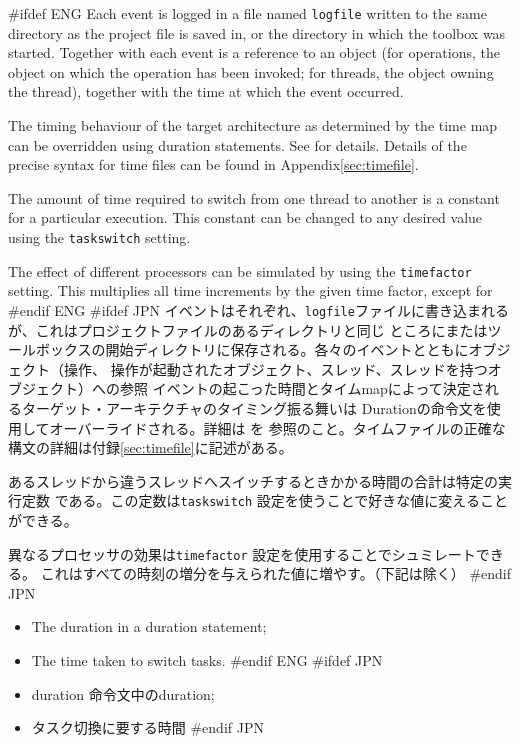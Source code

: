 \documentclass[\pformat,12pt]{article}
\begin{document}
#ifdef ENG
Each event is logged in a file named \texttt{logfile} written to the
same directory as the project file is saved in, or the directory in
which the toolbox was started. Together with each event is a reference
to an object (for operations, the object on which the operation has
been invoked; for threads, the object owning the thread), together
with the time at which the event occurred.

The timing behaviour of the target architecture as determined by the
time map can be overridden using duration statements. See
\cite{LangManPP-CSK} for details. Details of the precise syntax for time
files can be found in Appendix\ref{sec:timefile}.

The amount of time required to switch from one thread to another is a
constant for a particular execution. This constant can be changed to
any desired value using the \texttt{taskswitch} setting.

The effect of different processors can be simulated by using the
\texttt{timefactor} setting. This multiplies all time increments by
the given time factor, except for
#endif ENG
#ifdef JPN
イベントはそれぞれ、\texttt{logfile}ファイルに書き込まれるが、これはプロジェクトファイルのあるディレクトリと同じ
ところにまたはツールボックスの開始ディレクトリに保存される。各々のイベントとともにオブジェクト（操作、
操作が起動されたオブジェクト、スレッド、スレッドを持つオブジェクト）への参照
イベントの起こった時間とタイムmapによって決定されるターゲット・アーキテクチャのタイミング振る舞いは
Durationの命令文を使用してオーバーライドされる。詳細は\cite{LangManPP-CSK} を
参照のこと。タイムファイルの正確な構文の詳細は付録\ref{sec:timefile}に記述がある。

あるスレッドから違うスレッドへスイッチするときかかる時間の合計は特定の実行定数
である。この定数は\texttt{taskswitch} 設定を使うことで好きな値に変えることができる。

異なるプロセッサの効果は\texttt{timefactor} 設定を使用することでシュミレートできる。
これはすべての時刻の増分を与えられた値に増やす。（下記は除く）
#endif JPN

\begin{itemize}
#ifdef ENG
\item The duration in a duration statement;
\item The time taken to switch tasks.
#endif ENG
#ifdef JPN
\item duration 命令文中のduration;
\item タスク切換に要する時間
#endif JPN
\end{itemize}
\end{document}
